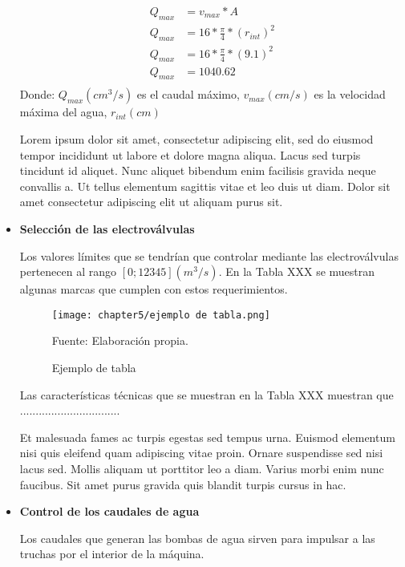 \begin{itemize}
	\begin{equation}\label{eq:calculo de caudal maximo}
		\begin{split}
			Q_{max} & = v_{max}*A \\
			Q_{max} & = 16*\frac{\pi}{4}*(r_{int})^2 \\
			Q_{max} & = 16*\frac{\pi}{4}*(9.1)^2 \\
			Q_{max} & = 1040.62 \\
		\end{split}		
	\end{equation}
	Donde: $Q_{max} (cm^3/s)$ es el caudal máximo, $v_{max} (cm/s)$ es la velocidad máxima del agua, $r_{int} (cm)$
	
	Lorem ipsum dolor sit amet, consectetur adipiscing elit, sed do eiusmod tempor incididunt ut labore et dolore magna aliqua. Lacus sed turpis tincidunt id aliquet. Nunc aliquet bibendum enim facilisis gravida neque convallis a. Ut tellus elementum sagittis vitae et leo duis ut diam. Dolor sit amet consectetur adipiscing elit ut aliquam purus sit.	

	
	\item \textbf{Selección de las electroválvulas}
	
	Los valores límites que se tendrían que controlar mediante las electroválvulas pertenecen al rango $[0;12345] (m^3/s)$. En la Tabla XXX se muestran algunas marcas que cumplen con estos requerimientos.
	
	
	\begin{figure}[H]
		\centering
		\texttt{[image: chapter5/ejemplo de tabla.png]}
		\caption{Ejemplo de tabla}
		\begin{myflushleftportland}
			Fuente: Elaboración propia.
		\end{myflushleftportland}
		\label{fig:ejemplo de tabla}
	\end{figure}
	
	Las características técnicas que se muestran en la Tabla XXX muestran que ................................
	
	Et malesuada fames ac turpis egestas sed tempus urna. Euismod elementum nisi quis eleifend quam adipiscing vitae proin. Ornare suspendisse sed nisi lacus sed. Mollis aliquam ut porttitor leo a diam. Varius morbi enim nunc faucibus. Sit amet purus gravida quis blandit turpis cursus in hac.
	
	\item \textbf{Control de los caudales de agua}
	
	Los caudales que generan las bombas de agua sirven para impulsar a las truchas por el interior de la máquina. 
	

\end{itemize}
